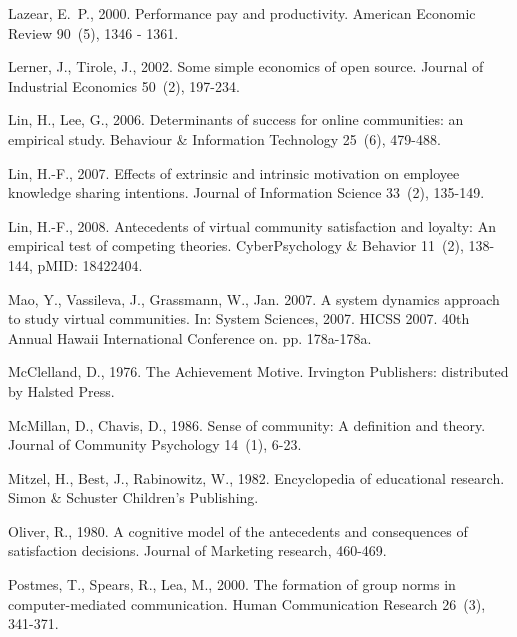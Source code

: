 \documentclass[doublespacing]{elsarticle}
\begin{document}
\begin{thebibliography}{52}
Lazear, E.~P., 2000. Performance pay and productivity. American Economic Review
  90~(5), 1346 - 1361.

Lerner, J., Tirole, J., 2002. Some simple economics of open source. Journal of
  Industrial Economics 50~(2), 197-234.


Lin, H., Lee, G., 2006. {Determinants of success for online communities: an
  empirical study}. Behaviour \& Information Technology 25~(6), 479-488.

Lin, H.-F., 2007. {Effects of extrinsic and intrinsic motivation on employee
  knowledge sharing intentions}. Journal of Information Science 33~(2),
  135-149.


Lin, H.-F., 2008. Antecedents of virtual community satisfaction and loyalty: An
  empirical test of competing theories. CyberPsychology \& Behavior 11~(2),
  138-144, pMID: 18422404.



Mao, Y., Vassileva, J., Grassmann, W., Jan. 2007. A system dynamics approach to
  study virtual communities. In: System Sciences, 2007. HICSS 2007. 40th Annual
  Hawaii International Conference on. pp. 178a-178a.

McClelland, D., 1976. The Achievement Motive. Irvington Publishers: distributed
  by Halsted Press.

McMillan, D., Chavis, D., 1986. {Sense of community: A definition and theory}.
  Journal of Community Psychology 14~(1), 6-23.

Mitzel, H., Best, J., Rabinowitz, W., 1982. {Encyclopedia of educational
  research}. Simon \& Schuster Children's Publishing.

Oliver, R., 1980. {A cognitive model of the antecedents and consequences of
  satisfaction decisions}. Journal of Marketing research, 460-469.

Postmes, T., Spears, R., Lea, M., 2000. The formation of group norms in
  computer-mediated communication. Human Communication Research 26~(3),
  341-371.



\end{thebibliography}
\end{document}
